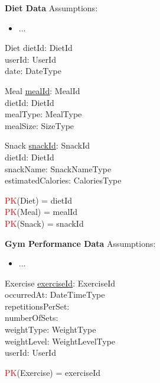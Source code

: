 \documentclass{article}
\begin{document}
\vspace{0.2cm}
\hspace{-0.5cm}\textbf{Diet Data}
\newline \newline Assumptions:
\begin{itemize}
  \item ...
\end{itemize}

\begin{schema}{Diet}
    dietId: DietId \\
    userId: UserId \\
    date: DateType \\
\end{schema}

\begin{schema}{Meal}
	\underline{mealId}: MealId \\
    dietId: DietId \\
    mealType: MealType \\
    mealSize: SizeType \\
\end{schema}

\begin{schema}{Snack}
	\underline{snackId}: SnackId \\
    dietId: DietId \\
    snackName: SnackNameType \\
    estimatedCalories: CaloriesType \\
\end{schema}

\begin{zed}
\textcolor{red}{PK}(Diet) = { dietId } \\
\textcolor{red}{PK}(Meal) = { mealId } \\
\textcolor{red}{PK}(Snack) = { snackId } \\
\end{zed}
    
\vspace{0.2cm}
\hspace{-0.5cm}\textbf{Gym Performance Data}
\newline \newline Assumptions:
\begin{itemize}
  \item ...
\end{itemize}

\begin{schema}{Exercise}
	\underline{exerciseId}: ExerciseId \\
    occurredAt: DateTimeType \\
    repetitionsPerSet: \nat \\
    numberOfSets: \nat \\
    weightType: WeightType \\
    weightLevel: WeightLevelType \\
    userId: UserId \\
\end{schema}
\begin{zed}
\textcolor{red}{PK}(Exercise) = { exerciseId } \\
\end{zed}
\end{document}
